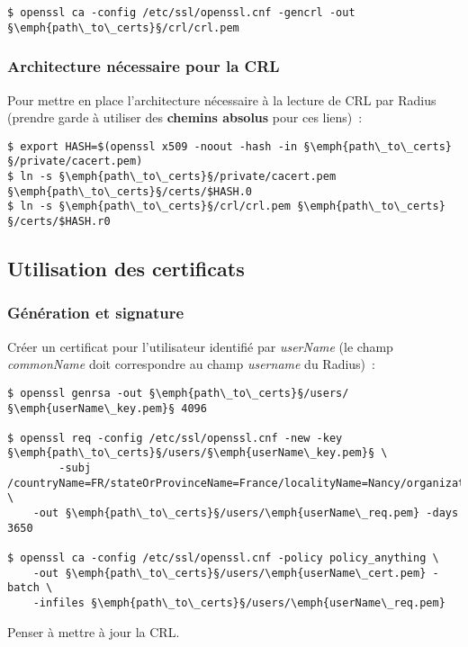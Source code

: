 \begin{lstlisting}
$ openssl ca -config /etc/ssl/openssl.cnf -gencrl -out §\emph{path\_to\_certs}§/crl/crl.pem
\end{lstlisting}

\subsubsection{Architecture nécessaire pour la CRL}

Pour mettre en place l'architecture nécessaire à la lecture de CRL par Radius (prendre garde à utiliser des \textbf{chemins absolus} pour ces liens)~:

\begin{lstlisting}
$ export HASH=$(openssl x509 -noout -hash -in §\emph{path\_to\_certs}§/private/cacert.pem)
$ ln -s §\emph{path\_to\_certs}§/private/cacert.pem §\emph{path\_to\_certs}§/certs/$HASH.0
$ ln -s §\emph{path\_to\_certs}§/crl/crl.pem §\emph{path\_to\_certs}§/certs/$HASH.r0
\end{lstlisting}

\subsection{Utilisation des certificats}
\subsubsection{Génération et signature}

Créer un certificat pour l'utilisateur identifié par \emph{userName} (le champ \emph{commonName} doit correspondre au champ \emph{username} du Radius)~:

\begin{lstlisting}
$ openssl genrsa -out §\emph{path\_to\_certs}§/users/§\emph{userName\_key.pem}§ 4096

$ openssl req -config /etc/ssl/openssl.cnf -new -key §\emph{path\_to\_certs}§/users/§\emph{userName\_key.pem}§ \
        -subj /countryName=FR/stateOrProvinceName=France/localityName=Nancy/organizationName=BHConsulting/commonName=userName/ \
	-out §\emph{path\_to\_certs}§/users/\emph{userName\_req.pem} -days 3650

$ openssl ca -config /etc/ssl/openssl.cnf -policy policy_anything \
	-out §\emph{path\_to\_certs}§/users/\emph{userName\_cert.pem} -batch \
	-infiles §\emph{path\_to\_certs}§/users/\emph{userName\_req.pem}
\end{lstlisting}

Penser à mettre à jour la CRL.

